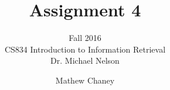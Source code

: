 \documentclass[10pt,letterpaper,bibliography=totocnumbered]{scrartcl}
\begin{document}
\author{Mathew Chaney}
\title{Assignment 4}
\subtitle{Fall 2016\\ CS834 Introduction to Information Retrieval\\ Dr. Michael Nelson}
\maketitle
\newpage

\tableofcontents
\lstlistoflistings
\listoffigures
\listoftables










\end{document}
